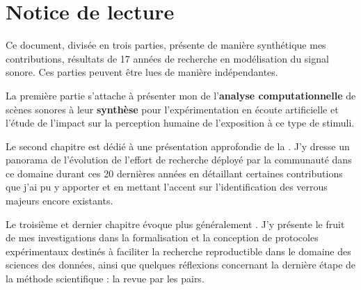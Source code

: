 \chapter{\nmu Notice \nmu de lecture} \label{chap:notice}

Ce document, divisée en trois parties, présente de manière synthétique mes contributions, résultats de 17 années de recherche en modélisation du signal sonore. Ces parties peuvent être lues de manière indépendantes.

La première partie s'attache à présenter mon  de l'\textbf{analyse computationnelle} de scènes sonores à leur \textbf{synthèse} pour l'expérimentation en écoute artificielle et l'étude de l'impact sur la perception humaine de l'exposition à ce type de stimuli.

Le second chapitre est dédié à une présentation approfondie de la . J'y dresse un panorama de l'évolution de l'effort de recherche déployé par la communauté dans ce domaine durant ces 20 dernières années en détaillant certaines contributions que j'ai pu y apporter et en mettant l'accent sur l'identification des verrous majeurs encore existants.

Le troisième et dernier chapitre évoque plus généralement . J'y présente le fruit de mes investigations dans la formalisation et la conception de protocoles expérimentaux destinés à faciliter la recherche reproductible dans le domaine des sciences des données, ainsi que quelques réflexions concernant la dernière étape de la méthode scientifique : la revue par les pairs.

